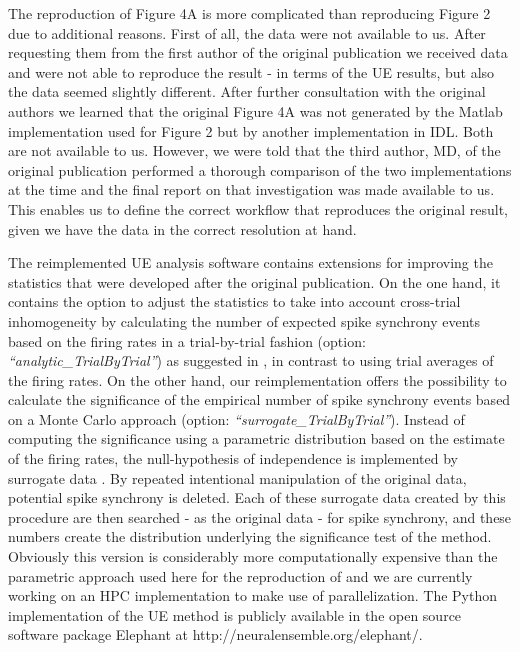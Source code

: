 \documentclass[10pt,a4paper,onecolumn]{article}
\begin{document}
The reproduction of Figure 4A is more complicated than reproducing
Figure 2 due to additional reasons. First of all, the data were not
available to us. After requesting them from the first author of the
original publication we received data and were not able to reproduce the
result - in terms of the UE results, but also the data seemed slightly
different. After further consultation with the original authors we
learned that the original Figure 4A was not generated by the Matlab
implementation used for Figure 2 but by another implementation in IDL.
Both are not available to us. However, we were told that the third
author, MD, of the original publication performed a thorough comparison
of the two implementations at the time and the final report on that
investigation was made available to us. This enables us to define the
correct workflow that reproduces the original result, given we have the
data in the correct resolution at hand.

The reimplemented UE analysis software contains extensions for improving
the statistics that were developed after the original publication. On
the one hand, it contains the option to adjust the statistics to take
into account cross-trial inhomogeneity by calculating the number of
expected spike synchrony events based on the firing rates in a
trial-by-trial fashion (option: \emph{``analytic\_TrialByTrial''}) as
suggested in \autocite{Gruen03b}, in contrast to using trial averages of
the firing rates. On the other hand, our reimplementation offers the
possibility to calculate the significance of the empirical number of
spike synchrony events based on a Monte Carlo approach (option:
\emph{``surrogate\_TrialByTrial''}). Instead of computing the
significance using a parametric distribution based on the estimate of
the firing rates, the null-hypothesis of independence is implemented by
surrogate data \autocites{Gruen09}{GruenRotter10_Chap10}{Louis10}. By
repeated intentional manipulation of the original data, potential spike
synchrony is deleted. Each of these surrogate data created by this
procedure are then searched - as the original data - for spike
synchrony, and these numbers create the distribution underlying the
significance test of the method. Obviously this version is considerably
more computationally expensive than the parametric approach used here
for the reproduction of \autocite{Riehle97} and we are currently working
on an HPC implementation to make use of parallelization. The Python
implementation of the UE method is publicly available in the open source
software package Elephant at http://neuralensemble.org/elephant/.
\end{document}
